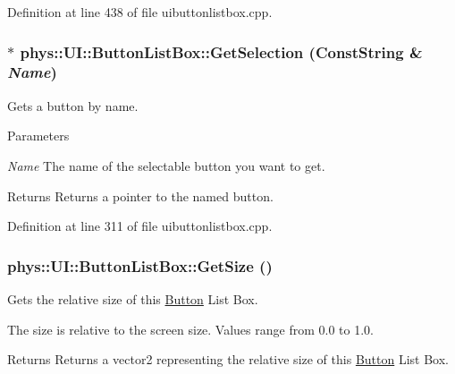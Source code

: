 Definition at line 438 of file uibuttonlistbox.cpp.

\hypertarget{classphys_1_1UI_1_1ButtonListBox_a88796d75b2677b0a8e5d70fcf3677348}{
\subsubsection[{GetSelection}]{ $\ast$ phys::UI::ButtonListBox::GetSelection ({\bf ConstString} \& {\em Name})}}
\label{d4/dd7/classphys_1_1UI_1_1ButtonListBox_a88796d75b2677b0a8e5d70fcf3677348}


Gets a button by name. 


\begin{DoxyParams}{Parameters}
\item[{\em Name}]The name of the selectable button you want to get. \end{DoxyParams}
\begin{DoxyReturn}{Returns}
Returns a pointer to the named button. 
\end{DoxyReturn}


Definition at line 311 of file uibuttonlistbox.cpp.

\hypertarget{classphys_1_1UI_1_1ButtonListBox_a0084510b0b9c53761e5b4a45f65604ab}{
\subsubsection[{GetSize}]{ phys::UI::ButtonListBox::GetSize ()}}
\label{d4/dd7/classphys_1_1UI_1_1ButtonListBox_a0084510b0b9c53761e5b4a45f65604ab}


Gets the relative size of this \hyperlink{classphys_1_1UI_1_1Button}{Button} List Box. 

The size is relative to the screen size. Values range from 0.0 to 1.0. \begin{DoxyReturn}{Returns}
Returns a vector2 representing the relative size of this \hyperlink{classphys_1_1UI_1_1Button}{Button} List Box. 
\end{DoxyReturn}


